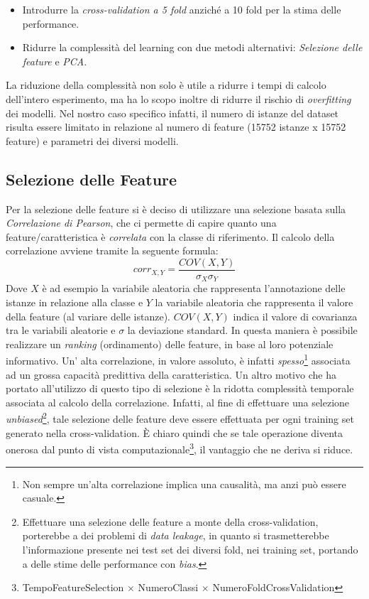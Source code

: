 \documentclass[12pt]{report}
\begin{document}
\begin{itemize}
\item Introdurre la \emph{cross-validation a 5 fold} anziché a 10 fold per la stima delle performance.
\item Ridurre la complessità del learning con due metodi alternativi: \emph{Selezione delle feature} e \emph{PCA}.
\end{itemize} 

La riduzione della complessità non solo è utile a ridurre i tempi di calcolo dell'intero esperimento, ma ha lo scopo inoltre di ridurre il rischio di \emph{overfitting} dei modelli. Nel nostro caso specifico infatti, il numero di istanze del dataset risulta essere limitato in relazione al numero di feature (15752 istanze x 15752 feature) e parametri dei diversi modelli\cite{cesarid}.

\subsection{Selezione delle Feature}
Per la selezione delle feature si è deciso di utilizzare una selezione basata sulla \emph{Correlazione di Pearson}\cite{ROSS}, che ci permette di capire quanto una feature/caratteristica è \emph{correlata} con la classe di riferimento. 
\newline
\newline
Il calcolo della correlazione avviene tramite la seguente formula:
\[
corr_{X,Y} = \frac{COV(X,Y)}{\sigma_{X}\sigma_{Y}}
\]
Dove $X$ è ad esempio la variabile aleatoria che rappresenta l'annotazione delle istanze in relazione alla classe e $Y$ la variabile aleatoria che rappresenta il valore della feature (al variare delle istanze). $COV(X, Y)$ indica il valore di covarianza tra le variabili aleatorie e $\sigma$ la deviazione standard.
\newline
\newline
In questa maniera è possibile realizzare un \emph{ranking} (ordinamento) delle feature, in base al loro potenziale informativo. Un' alta correlazione, in valore assoluto, è infatti \emph{spesso}\footnote{\footnotesize{Non sempre un'alta correlazione implica una causalità, ma anzi può essere casuale.}} associata ad un grossa capacità predittiva della caratteristica.
\newline
\newline
Un altro motivo che ha portato all'utilizzo di questo tipo di selezione è la ridotta complessità temporale associata al calcolo della correlazione. Infatti, al fine di effettuare una selezione \emph{unbiased}\cite{unbiased}\footnote{\footnotesize{Effettuare una selezione delle feature a monte della cross-validation, porterebbe a dei problemi di \emph{data leakage}, in quanto si trasmetterebbe l'informazione presente nei test set dei diversi fold, nei training set, portando a delle stime delle performance con \emph{bias}.}}, tale selezione delle feature deve essere effettuata per ogni training set generato nella cross-validation. È chiaro quindi che se tale operazione diventa onerosa dal punto di vista computazionale\footnote{\footnotesize{TempoFeatureSelection $\times$ NumeroClassi $\times$ NumeroFoldCrossValidation}}, il vantaggio che ne deriva si riduce.
\end{document}
